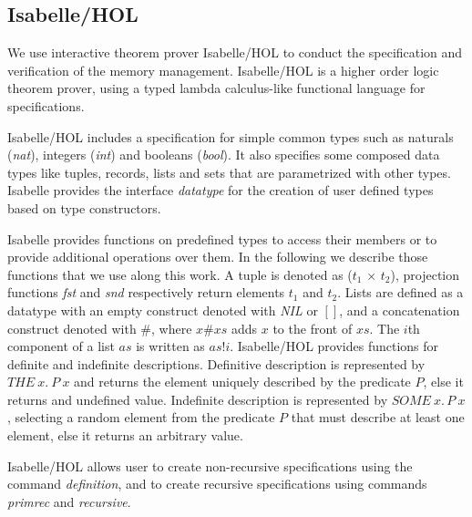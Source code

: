 \subsection{Isabelle/HOL}
We use interactive theorem prover Isabelle/HOL\cite{reg_Isabelle/HOL} to conduct the specification and verification of the memory management. Isabelle/HOL is a higher order logic theorem prover, using a typed lambda calculus-like functional language for specifications.

Isabelle/HOL includes a specification for simple common types such as naturals (\emph{nat}), integers (\emph{int}) and booleans (\emph{bool}). It also specifies some composed data types like tuples, records, lists and sets that are parametrized with other types. Isabelle provides the interface \emph{datatype} for the creation of user defined types based on type constructors. 

Isabelle provides functions on predefined types to access their members or to provide additional operations over them. In the following we describe those functions that we use along this work. A tuple is denoted as (\emph{$t_1$} $\times$ \emph{$t_2$}), projection functions \emph{fst} and \emph{snd} respectively return elements $t_1$ and $t_2$. Lists are defined as a datatype with an empty construct denoted with \emph{NIL} or $[]$, and a concatenation construct denoted with $\#$, where $x\#xs$ adds $x$ to the front of $xs$. The $i$th component of a list $as$ is written as $as!i$. Isabelle/HOL provides functions for definite and indefinite descriptions. Definitive description is represented by $THE\ x.\ P\ x$ and returns the element uniquely described by the predicate $P$, else it returns and undefined value. Indefinite description is represented by $SOME\ x.\, P\ x$, selecting a random element from the predicate $P$ that must describe at least one element, else it returns an arbitrary value.

Isabelle/HOL allows user to create non-recursive specifications using the command \emph{definition}, and to create recursive specifications using commands \emph{primrec} and \emph{recursive}.
